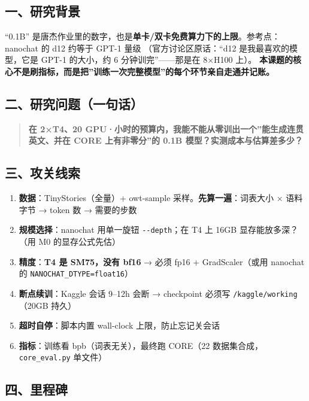 \documentclass[
  chinese,
  11pt,
]{ctexart}
\providecommand{\tightlist}{%
  \setlength{\itemsep}{0pt}\setlength{\parskip}{0pt}}
\begin{document}
\subsection{一、研究背景}\label{ux4e00ux7814ux7a76ux80ccux666f-2}

``0.1B'' 是唐杰作业里的数字，也是\textbf{单卡/双卡免费算力下的上限}。参考点：nanochat 的 d12 约等于 GPT-1 量级 （官方讨论区原话：``d12 是我最喜欢的模型，它是 GPT-1 的大小，约 6 分钟训完''------那是在 8×H100 上）。 \textbf{本课题的核心不是刷指标，而是把''训练一次完整模型''的每个环节亲自走通并记账。}

\subsection{二、研究问题（一句话）}\label{ux4e8cux7814ux7a76ux95eeux9898ux4e00ux53e5ux8bdd-2}

\begin{quote}
\textbf{在 2×T4、20 GPU·小时的预算内，我能不能从零训出一个''能生成连贯英文、并在 CORE 上有非零分''的 0.1B 模型？实测成本与估算差多少？}
\end{quote}

\subsection{三、攻关线索}\label{ux4e09ux653bux5173ux7ebfux7d22-2}

\begin{enumerate}
\def\labelenumi{\arabic{enumi}.}
\tightlist
\item
  \textbf{数据}：TinyStories（全量）+ owt-sample 采样。\textbf{先算一遍}：词表大小 × 语料字节 → token 数 → 需要的步数
\item
  \textbf{规模选择}：nanochat 用单一旋钮 \texttt{-\/-depth}；在 T4 上 16GB 显存能放多深？（用 M0 的显存公式先估）
\item
  \textbf{精度}：\textbf{T4 是 SM75，没有 bf16} → 必须 fp16 + GradScaler（或用 nanochat 的 \texttt{NANOCHAT\_DTYPE=float16}）
\item
  \textbf{断点续训}：Kaggle 会话 9--12h 会断 → checkpoint 必须写 \texttt{/kaggle/working}（20GB 持久）
\item
  \textbf{超时自停}：脚本内置 wall-clock 上限，防止忘记关会话
\item
  \textbf{指标}：训练看 bpb（词表无关），最终跑 CORE（22 数据集合成，\texttt{core\_eval.py} 单文件）
\end{enumerate}

\subsection{四、里程碑}\label{ux56dbux91ccux7a0bux7891-2}
\end{document}

